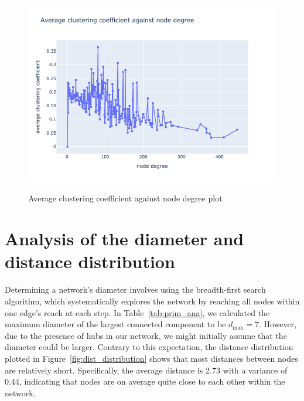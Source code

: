 \documentclass[paper=a4,fontsize=11pt,DIV=8,BCOR=5mm,oneside,pdftex,bibtotocnumbered]{scrreprt}
\theoremstyle{plain}
\begin{document}
	\begin{figure}
		\centering
		\caption{Average clustering coefficient against node degree plot}
		\includegraphics[scale=0.6]{avg_clustering_vs_degree.png}
		\label{fig:avg_clust_coeff_vs_degree}
	\end{figure}
	
	\section{Analysis of the diameter and distance distribution}
	Determining a network's diameter involves using the breadth-first search algorithm, which systematically explores the network by reaching all nodes within one edge's reach at each step. In Table~\ref{tab:prim_ana}, we calculated the maximum diameter of the largest connected component to be $ d_{\text{max}} = 7 $. However, due to the presence of hubs in our network, we might initially assume that the diameter could be larger. Contrary to this expectation, the distance distribution plotted in Figure~\ref{fig:dist_distribution} shows that most distances between nodes are relatively short. Specifically, the average distance is 2.73 with a variance of 0.44, indicating that nodes are on average quite close to each other within the network.
	
\end{document}
